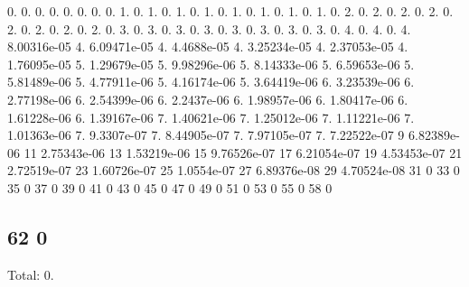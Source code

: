 0. 0. 0. 0. 0. 0. 0. 0. 1. 0. 1. 0. 1. 0. 1. 0. 1. 0. 1. 0. 1. 0. 1. 0. 2. 0. 2. 0. 2. 0. 2. 0. 2. 0. 2. 0. 2. 0. 2. 0. 3. 0. 3. 0. 3. 0. 3. 0. 3. 0. 3. 0. 3. 0. 3. 0. 4. 0. 4. 0. 4. 8.\+00316e-\/05 4. 6.\+09471e-\/05 4. 4.\+4688e-\/05 4. 3.\+25234e-\/05 4. 2.\+37053e-\/05 4. 1.\+76095e-\/05 5. 1.\+29679e-\/05 5. 9.\+98296e-\/06 5. 8.\+14333e-\/06 5. 6.\+59653e-\/06 5. 5.\+81489e-\/06 5. 4.\+77911e-\/06 5. 4.\+16174e-\/06 5. 3.\+64419e-\/06 6. 3.\+23539e-\/06 6. 2.\+77198e-\/06 6. 2.\+54399e-\/06 6. 2.\+2437e-\/06 6. 1.\+98957e-\/06 6. 1.\+80417e-\/06 6. 1.\+61228e-\/06 6. 1.\+39167e-\/06 7. 1.\+40621e-\/06 7. 1.\+25012e-\/06 7. 1.\+11221e-\/06 7. 1.\+01363e-\/06 7. 9.\+3307e-\/07 7. 8.\+44905e-\/07 7. 7.\+97105e-\/07 7. 7.\+22522e-\/07 9 6.\+82389e-\/06 11 2.\+75343e-\/06 13 1.\+53219e-\/06 15 9.\+76526e-\/07 17 6.\+21054e-\/07 19 4.\+53453e-\/07 21 2.\+72519e-\/07 23 1.\+60726e-\/07 25 1.\+0554e-\/07 27 6.\+89376e-\/08 29 4.\+70524e-\/08 31 0 33 0 35 0 37 0 39 0 41 0 43 0 45 0 47 0 49 0 51 0 53 0 55 0 58 0 \subsection*{62 0 }

Total\+: 0. 